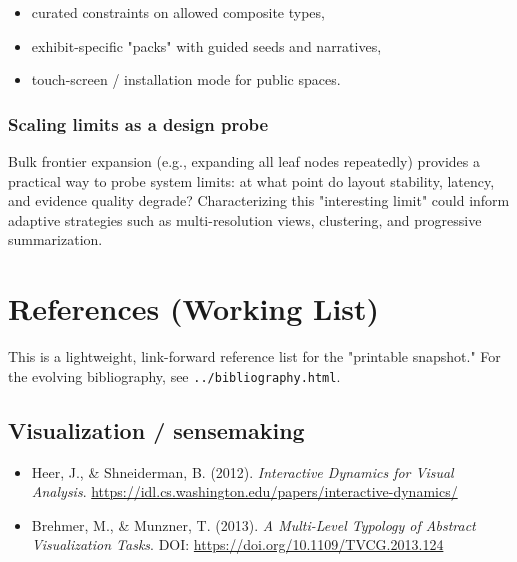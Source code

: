\begin{itemize}[leftmargin=*]

\item curated constraints on allowed composite types,

\item exhibit-specific "packs" with guided seeds and narratives,

\item touch-screen / installation mode for public spaces.

\end{itemize}

\subsubsection{Scaling limits as a design probe}

Bulk frontier expansion (e.g., expanding all leaf nodes repeatedly) provides a practical way to probe system limits: at what point do layout stability, latency, and evidence quality degrade? Characterizing this "interesting limit" could inform adaptive strategies such as multi-resolution views, clustering, and progressive summarization.

\section*{References (Working List)}

This is a lightweight, link-forward reference list for the "printable snapshot." For the evolving bibliography, see \texttt{../bibliography.html}.

\subsection*{Visualization / sensemaking}

\begin{itemize}[leftmargin=*]

\item Heer, J., \& Shneiderman, B. (2012). \emph{Interactive Dynamics for Visual Analysis}. \url{https://idl.cs.washington.edu/papers/interactive-dynamics/}

\item Brehmer, M., \& Munzner, T. (2013). \emph{A Multi-Level Typology of Abstract Visualization Tasks}. DOI: \url{https://doi.org/10.1109/TVCG.2013.124}

\end{itemize}

